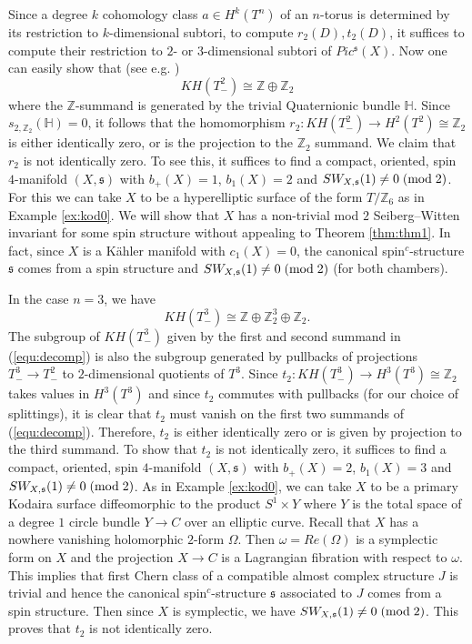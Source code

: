 \documentclass{amsart}
\theoremstyle{definition}
\theoremstyle{remark}
\numberwithin{equation}{section}
\begin{document}
Since a degree $k$ cohomology class $a \in H^k(T^n)$ of an $n$-torus is determined by its restriction to $k$-dimensional subtori, to compute $r_2(D),t_2(D)$, it suffices to compute their restriction to $2$- or $3$-dimensional subtori of $Pic^{\mathfrak{s}}(X)$. Now one can easily show that (see e.g. \cite{fk})
\[
KH( T^2_-) \cong \mathbb{Z} \oplus \mathbb{Z}_2
\]
where the $\mathbb{Z}$-summand is generated by the trivial Quaternionic bundle $\mathbb{H}$. Since $s_{2,\mathbb{Z}_2}(\mathbb{H}) = 0$, it follows that the homomorphism $r_2 : KH(T^2_-) \to H^2(T^2) \cong \mathbb{Z}_2$ is either identically zero, or is the projection to the $\mathbb{Z}_2$ summand. We claim that $r_2$ is not identically zero. To see this, it suffices to find a compact, oriented, spin $4$-manifold $(X , \mathfrak{s})$ with $b_+(X) = 1$, $b_1(X) = 2$ and $SW_{X,\mathfrak{s}}(1) \neq 0 \; ({\rm mod} \; 2)$. For this we can take $X$ to be a hyperelliptic surface of the form $T/\mathbb{Z}_6$ as in Example \ref{ex:kod0}. We will show that $X$ has a non-trivial mod $2$ Seiberg--Witten invariant for some spin structure without appealing to Theorem \ref{thm:thm1}. In fact, since $X$ is a K\"ahler manifold with $c_1(X) = 0$, the canonical spin$^c$-structure $\mathfrak{s}$ comes from a spin structure and $SW_{X,\mathfrak{s}}(1) \neq 0 \; ({\rm mod} \; 2)$ (for both chambers).

In the case $n=3$, we have
\begin{equation}\label{equ:decomp}
KH( T^3_-) \cong \mathbb{Z} \oplus \mathbb{Z}_2^3 \oplus \mathbb{Z}_2.
\end{equation}
The subgroup of $KH(T^3_-)$ given by the first and second summand in (\ref{equ:decomp}) is also the subgroup generated by pullbacks of projections $T^3_- \to T^2_-$ to $2$-dimensional quotients of $T^3$. Since $t_2 : KH(T^3_-) \to H^3(T^3) \cong \mathbb{Z}_2$ takes values in $H^3(T^3)$ and since $t_2$ commutes with pullbacks (for our choice of splittings), it is clear that $t_2$ must vanish on the first two summands of (\ref{equ:decomp}). Therefore, $t_2$ is either identically zero or is given by projection to the third summand. To show that $t_2$ is not identically zero, it suffices to find a compact, oriented, spin $4$-manifold $(X , \mathfrak{s})$ with $b_+(X) = 2$, $b_1(X) = 3$ and $SW_{X , \mathfrak{s}}(1) \neq 0 \; ({\rm mod} \; 2)$. As in Example \ref{ex:kod0}, we can take $X$ to be a primary Kodaira surface diffeomorphic to the product $S^1 \times Y$ where $Y$ is the total space of a degree $1$ circle bundle $Y \to C$ over an elliptic curve. Recall that $X$ has a nowhere vanishing holomorphic $2$-form $\Omega$. Then $\omega = Re(\Omega)$ is a symplectic form on $X$ and the projection $X \to C$ is a Lagrangian fibration with respect to $\omega$. This implies that first Chern class of a compatible almost complex structure $J$ is trivial and hence the canonical spin$^c$-structure $\mathfrak{s}$ associated to $J$ comes from a spin structure. Then since $X$ is symplectic, we have $SW_{X , \mathfrak{s}}(1) \neq 0 \; ({\rm mod} \; 2)$. This proves that $t_2$ is not identically zero.
\end{document}
